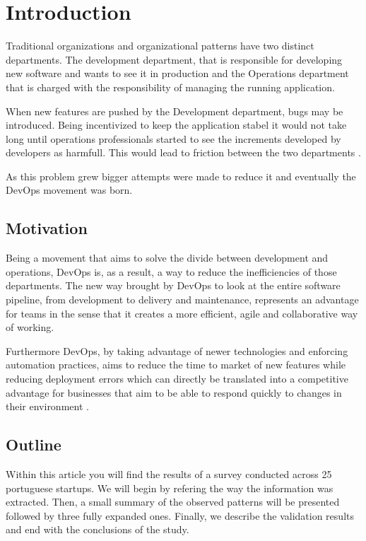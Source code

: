 \documentclass{llncs}
\begin{document}
\pagebreak

\section{Introduction}
  Traditional organizations and organizational patterns have two distinct departments. The development department, that is responsible for developing new software and wants to see it in production\cite{Bass} and the Operations department that is charged with the responsibility of managing the running application\cite{Bass}.

  When new features are pushed by the Development department, bugs may be introduced. Being incentivized to keep the application stabel it would not take long until operations professionals started to see the increments developed by developers as harmfull. This would lead to friction between the two departments \cite{Bass}.

  As this problem grew bigger attempts were made to reduce it and eventually the DevOps movement was born.

  \subsection{Motivation}

  Being a movement that aims to solve the divide between development and operations, DevOps is, as a result, a way to reduce the inefficiencies of those departments. The new way brought by DevOps to look at the entire software pipeline, from development to delivery and maintenance, represents an advantage for teams in the sense that it creates a more efficient, agile and collaborative way of working.

  Furthermore DevOps, by taking advantage of newer technologies and enforcing automation practices, aims to reduce the time to market of new features while reducing deployment errors \cite{Bass} which can directly be translated into a competitive advantage for businesses that aim to be able to respond quickly to changes in their environment \cite{Wettinger2014}.

  \subsection{Outline}
  Within this article you will find the results of a survey conducted across 25 portuguese startups.
  We will begin by refering the way the information was extracted. Then, a small summary of the observed patterns will be presented followed by three fully expanded ones.
  Finally, we describe the validation results and end with the conclusions of the study.
\end{document}
